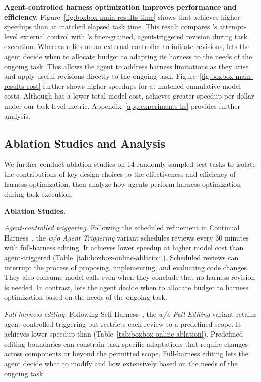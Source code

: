 \textbf{Agent-controlled harness optimization improves performance and efficiency.}
Figure~\ref{fig:boxbox-main-results-time} shows that \boxbox{} achieves higher speedups than \hs{} at matched elapsed task time. This result compares \hs{}'s attempt-level external control with \boxbox{}'s finer-grained, agent-triggered revision during task execution. Whereas \hs{} relies on an external controller to initiate revisions, \boxbox{} lets the agent decide when to allocate budget to adapting its harness to the needs of the ongoing task. This allows the agent to address harness limitations as they arise and apply useful revisions directly to the ongoing task. Figure~\ref{fig:boxbox-main-results-cost} further shows higher speedups for \boxbox{} at matched cumulative model costs. Although \hs{} has a lower total model cost, \boxbox{} achieves greater speedup per dollar under our task-level metric. Appendix~\ref{app:experiments-hs} provides further analysis.

\subsection{Ablation Studies and Analysis}
\label{sec:experiments-ablation}

We further conduct ablation studies on 14 randomly sampled test tasks to isolate the contributions of key design choices to the effectiveness and efficiency of harness optimization, then analyze how agents perform harness optimization during task execution.

\textbf{Ablation Studies.}



\textit{Agent-controlled triggering.}
Following the scheduled refinement in Continual Harness~\citep{karten2026continualharness}, the \textit{w/o Agent Triggering} variant schedules reviews every 30 minutes with full-harness editing. It achieves lower speedup at higher model cost than agent-triggered \boxbox{} (Table~\ref{tab:boxbox-online-ablation}). Scheduled reviews can interrupt the process of proposing, implementing, and evaluating code changes. They also consume model calls even when they conclude that no harness revision is needed. In contrast, \boxbox{} lets the agent decide when to allocate budget to harness optimization based on the needs of the ongoing task.

\textit{Full-harness editing.}
Following Self-Harness~\citep{zhang2026selfharness}, the \textit{w/o Full Editing} variant retains agent-controlled triggering but restricts each review to a predefined scope. It achieves lower speedup than \boxbox{} (Table~\ref{tab:boxbox-online-ablation}). Predefined editing boundaries can constrain task-specific adaptations that require changes across components or beyond the permitted scope. Full-harness editing lets the agent decide what to modify and how extensively based on the needs of the ongoing task.

